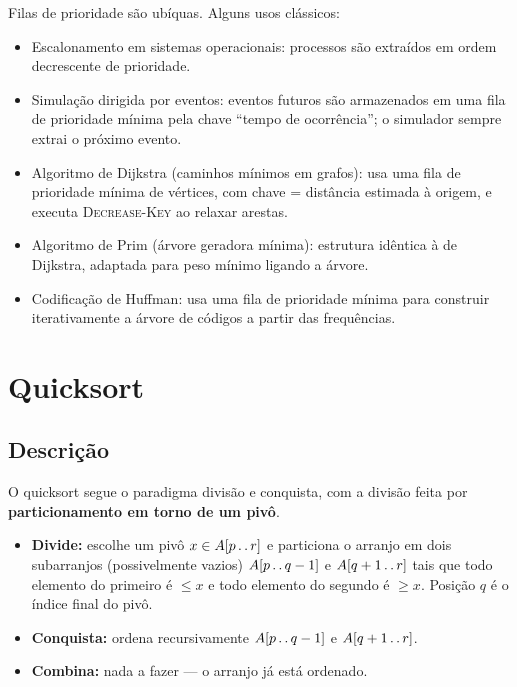 \documentclass[9pt,a4paper]{extarticle}
\newcommand{\impt}[1]{\textcolor{important}{#1}}
\theoremstyle{definition}
\begin{document}
Filas de prioridade são ubíquas. Alguns usos clássicos:
\begin{itemize}
  \item \impt{Escalonamento em sistemas operacionais}: processos são
    extraídos em ordem decrescente de prioridade.
  \item \impt{Simulação dirigida por eventos}: eventos futuros são
    armazenados em uma fila de prioridade mínima pela chave ``tempo de
    ocorrência''; o simulador sempre extrai o próximo evento.
  \item \impt{Algoritmo de Dijkstra} (caminhos mínimos em grafos): usa
    uma fila de prioridade mínima de vértices, com chave = distância
    estimada à origem, e executa \textsc{Decrease-Key} ao relaxar
    arestas.
  \item \impt{Algoritmo de Prim} (árvore geradora mínima): estrutura
    idêntica à de Dijkstra, adaptada para peso mínimo ligando a árvore.
  \item \impt{Codificação de Huffman}: usa uma fila de prioridade
    mínima para construir iterativamente a árvore de códigos a partir
    das frequências.
\end{itemize}
 

\section{Quicksort}

\subsection{Descrição}

O quicksort segue o paradigma \impt{divisão e conquista}, com a divisão
feita por \textbf{particionamento em torno de um pivô}.

\begin{itemize}
  \item \textbf{Divide:} escolhe um pivô $x \in A[p\mathinner{.\,.} r]$ e particiona
    o arranjo em dois subarranjos (possivelmente vazios) $A[p\mathinner{.\,.} q-1]$
    e $A[q+1\mathinner{.\,.} r]$ tais que todo elemento do primeiro é $\le x$ e todo
    elemento do segundo é $\ge x$. Posição $q$ é o índice final do pivô.
  \item \textbf{Conquista:} ordena recursivamente $A[p\mathinner{.\,.} q-1]$ e
    $A[q+1\mathinner{.\,.} r]$.
  \item \textbf{Combina:} nada a fazer --- o arranjo já está ordenado.
\end{itemize}
\end{document}
